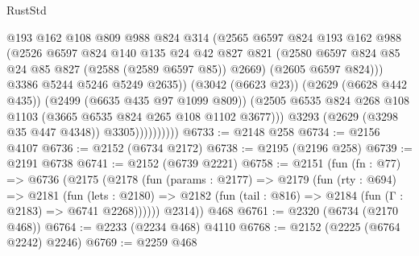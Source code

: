 \begin{lexlean}{RustStd}
\begin{coremodule}
                              @193
                              @162
                              @108
                              @809
                              @988
                              @824
                              @314
                              (@2565
                                @6597
                                @824
                                @193
                                @162
                                @988
                                (@2526
                                  @6597
                                  @824
                                  @140
                                  @135
                                  @24
                                  @42
                                  @827
                                  @821
                                  (@2580
                                    @6597
                                    @824
                                    @85
                                    @24
                                    @85
                                    @827
                                    (@2588 (@2589 @6597 @85))
                                    @2669)
                                  (@2605 @6597 @824)))
                              @3386
                              @5244
                              @5246
                              @5249
                              @2635))
                          (@3042 (@6623 @23))
                          (@2629 (@6628 @442 @435))
                          (@2499 (@6635 @435 @97 @1099 @809))
                          (@2505
                            @6535
                            @824
                            @268
                            @108
                            @1103
                            (@3665 @6535 @824 @265 @108 @1102 @3677)))
                        @3293
                        (@2629 (@3298 @35 @447 @4348))
                        @3305))))))))))
@6733 := @2148 @258
@6734 := @2156 @4107
@6736 := @2152 (@6734 @2172)
@6738 := @2195 (@2196 @258)
@6739 := @2191 @6738
@6741 := @2152 (@6739 @2221)
@6758 := @2151
    (fun (fn : @77) =>
    @6736
      (@2175
        (@2178
          (fun (params : @2177) =>
          @2179
            (fun (rty : @694) =>
            @2181
              (fun (lets : @2180) =>
              @2182 (fun (tail : @816) => @2184 (fun (Γ : @2183) => @6741 @2268))))))
        @2314))
    @468
@6761 := @2320 (@6734 (@2170 @468))
@6764 := @2233 (@2234 @468) @4110
@6768 := @2152 (@2225 (@6764 @2242) @2246)
@6769 := @2259 @468

\end{coremodule}
\end{lexlean}
